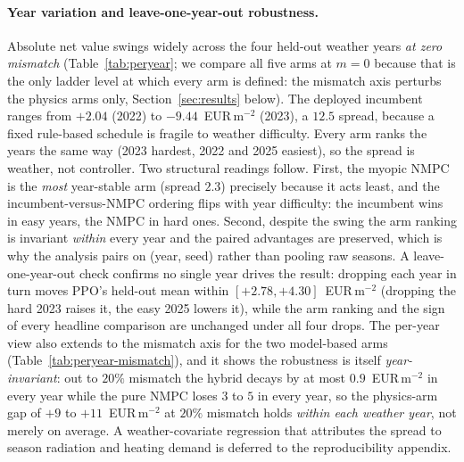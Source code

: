 \documentclass[11pt]{article}
\begin{document}
\paragraph{Year variation and leave-one-year-out robustness.} Absolute net value swings widely across the four held-out weather years \emph{at zero mismatch} (Table~\ref{tab:peryear}; we compare all five arms at $m=0$ because that is the only ladder level at which every arm is defined: the mismatch axis perturbs the physics arms only, Section~\ref{sec:results} below). The deployed incumbent ranges from $+2.04$ (2022) to $-9.44$~EUR\,m$^{-2}$ (2023), a $12.5$ spread, because a fixed rule-based schedule is fragile to weather difficulty. Every arm ranks the years the same way (2023 hardest, 2022 and 2025 easiest), so the spread is weather, not controller. Two structural readings follow. First, the myopic NMPC is the \emph{most} year-stable arm (spread $2.3$) precisely because it acts least, and the incumbent-versus-NMPC ordering flips with year difficulty: the incumbent wins in easy years, the NMPC in hard ones. Second, despite the swing the arm ranking is invariant \emph{within} every year and the paired advantages are preserved, which is why the analysis pairs on (year, seed) rather than pooling raw seasons. A leave-one-year-out check confirms no single year drives the result: dropping each year in turn moves PPO's held-out mean within $[+2.78, +4.30]$~EUR\,m$^{-2}$ (dropping the hard 2023 raises it, the easy 2025 lowers it), while the arm ranking and the sign of every headline comparison are unchanged under all four drops. The per-year view also extends to the mismatch axis for the two model-based arms (Table~\ref{tab:peryear-mismatch}), and it shows the robustness is itself \emph{year-invariant}: out to $20\%$ mismatch the hybrid decays by at most $0.9$~EUR\,m$^{-2}$ in every year while the pure NMPC loses $3$ to $5$ in every year, so the physics-arm gap of $+9$ to $+11$~EUR\,m$^{-2}$ at $20\%$ mismatch holds \emph{within each weather year}, not merely on average. A weather-covariate regression that attributes the spread to season radiation and heating demand is deferred to the reproducibility appendix.
\end{document}

